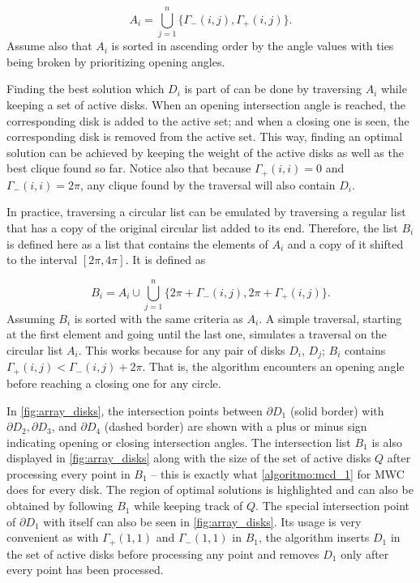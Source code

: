 \begin{equation*}
A_i = \bigcup_{j=1}^n \{ \Gamma_-(i,j), \Gamma_+(i,j) \}.
\end{equation*}
Assume also that $A_i$ is sorted in ascending order by the angle values with ties being broken by prioritizing opening angles.

Finding the best solution which $D_i$ is part of can be done by traversing $A_i$ while keeping a set of active disks. When an opening intersection angle is reached, the corresponding disk is added to the active set; and when a closing one is seen, the corresponding disk is removed from the active set. This way, finding an optimal solution can be achieved by keeping the weight of the active disks as well as the best clique found so far. Notice also that because $\Gamma_+(i,i)=0$ and $\Gamma_-(i,i)=2\pi$, any clique found by the traversal will also contain $D_i$.

In practice, traversing a circular list can be emulated by traversing a regular list that has a copy of the original circular list added to its end. 
Therefore, the list $B_i$ is defined here as a list that contains the elements of $A_i$ and a copy of it shifted to the interval $[2\pi, 4\pi]$. It is defined as

\begin{equation}\label{eq:b_i}
B_i = A_i\cup\bigcup_{j=1}^n \{ 2\pi+\Gamma_-(i,j), 2\pi+\Gamma_+(i,j) \}.
\end{equation}
Assuming $B_i$ is sorted with the same criteria as $A_i$. A simple traversal, starting at the first element and going until the last one, simulates a traversal on the circular list $A_i$.
This works because for any pair of disks $D_i$, $D_j$; $B_i$ contains $\Gamma_+(i,j) < \Gamma_-(i,j) + 2\pi$. That is, the algorithm encounters an opening angle before reaching a closing one for any circle.

In \autoref{fig:array_disks}, the intersection points between $\partial D_1$ (solid border) with $\partial D_2, \partial D_3$, and $\partial D_4$ (dashed border) are shown with a plus or minus sign indicating opening or closing intersection angles. 
The intersection list $B_1$ is also displayed in \autoref{fig:array_disks} along with the size of the set of active disks $Q$ after processing every point in $B_1$ -- this is exactly what \autoref{algoritmo:mcd_1} for MWC does for every disk. The region of optimal solutions is highlighted and can also be obtained by following $B_1$ while keeping track of $Q$.
The special intersection point of $\partial D_1$ with itself can also be seen in \autoref{fig:array_disks}. Its usage is very convenient as with $\Gamma_+(1, 1)$ and $\Gamma_-(1,1)$  in $B_1$, the algorithm inserts $D_1$ in the set of active disks before processing any point and removes $D_1$ only after every point has been processed.

